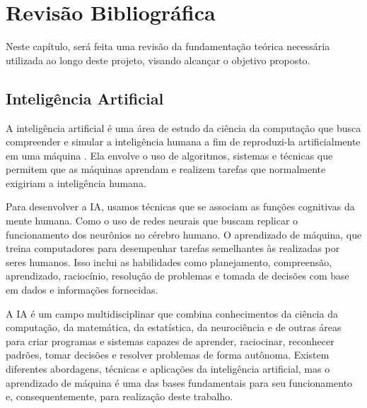 



\chapter{Revisão Bibliográfica}
\label{cap:02}

Neste capítulo, será feita uma revisão da fundamentação teórica necessária utilizada ao longo deste projeto, visando alcançar o objetivo proposto. %

\section{Inteligência Artificial}

A inteligência artificial é uma área de estudo da ciência da computação que busca compreender e simular a inteligência humana a fim de reproduzi-la artificialmente em uma máquina \cite{Haugeland1985}. Ela envolve o uso de algoritmos, sistemas e técnicas que permitem que as máquinas aprendam e realizem tarefas que normalmente exigiriam a inteligência humana.

Para desenvolver a IA, usamos técnicas que se associam as funções cognitivas da mente humana. Como o uso de redes neurais que buscam replicar o funcionamento dos neurônios no cérebro humano. O aprendizado de máquina, que treina computadores para desempenhar tarefas semelhantes às realizadas por seres humanos. Isso inclui as habilidades como planejamento, compreensão, aprendizado, raciocínio, resolução de problemas e tomada de decisões com base em dados e informações fornecidas.

A IA é um campo multidisciplinar que combina conhecimentos da ciência da computação, da matemática, da estatística, da neurociência e de outras áreas para criar programas e sistemas capazes de aprender, raciocinar, reconhecer padrões, tomar decisões e resolver problemas de forma autônoma. Existem diferentes abordagens, técnicas e aplicações da inteligência artificial, mas o aprendizado de máquina é uma das bases fundamentais para seu funcionamento e, consequentemente, para realização deste trabalho.


